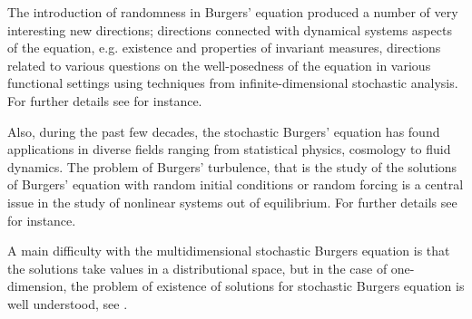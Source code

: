     The introduction of randomness in Burgers' equation produced a number of very interesting new directions; directions connected with dynamical systems aspects of the equation, e.g. existence and properties of invariant measures, directions related to various questions on the well-posedness of the equation in various functional settings using techniques from infinite-dimensional stochastic analysis. For further details see \cite{KARDAR1986} for instance.
    
    Also, during the past few decades, the stochastic Burgers' equation has found applications in diverse fields ranging from statistical physics, cosmology to fluid dynamics. The problem of Burgers' turbulence, that is the study of the solutions of Burgers' equation with random initial conditions or random forcing is a central issue in the study of nonlinear systems out of equilibrium. For further details see \cite{WEINAN, KHANIN2007} for instance.
    
    A main difficulty with the multidimensional stochastic Burgers equation is that the solutions take values in a distributional space, but in the case of one-dimension, the problem of existence of solutions for stochastic Burgers equation is well understood, see \cite{BERTINI1994, Catuogno2014, DAPRATO1994, PERKOWSKI2015}. 